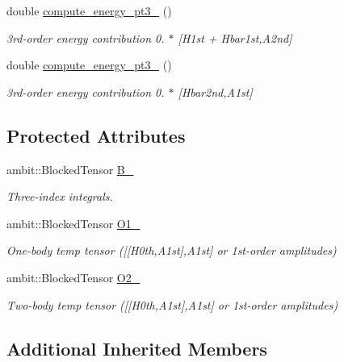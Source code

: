 \begin{DoxyCompactItemize}
double \mbox{\hyperlink{classforte_1_1_s_a___m_r_p_t3_af1f16b278d06c34e845c92f62b8391be}{compute\+\_\+energy\+\_\+pt3\+\_}} ()
\begin{DoxyCompactList}\small\item\em 3rd-\/order energy contribution 0. $\ast$ \mbox{[}H1st + Hbar1st,A2nd\mbox{]} \end{DoxyCompactList}\item 
double \mbox{\hyperlink{classforte_1_1_s_a___m_r_p_t3_a3b84286133023be8bcb7bda90abce666}{compute\+\_\+energy\+\_\+pt3\+\_}} ()
\begin{DoxyCompactList}\small\item\em 3rd-\/order energy contribution 0. $\ast$ \mbox{[}Hbar2nd,A1st\mbox{]} \end{DoxyCompactList}\end{DoxyCompactItemize}
\subsection*{Protected Attributes}
\begin{DoxyCompactItemize}
\item 
ambit\+::\+Blocked\+Tensor \mbox{\hyperlink{classforte_1_1_s_a___m_r_p_t3_ada00fb54bf1e92847e881151d85e9740}{B\+\_\+}}
\begin{DoxyCompactList}\small\item\em Three-\/index integrals. \end{DoxyCompactList}\item 
ambit\+::\+Blocked\+Tensor \mbox{\hyperlink{classforte_1_1_s_a___m_r_p_t3_a5b0747b050768825be3c5ff94adadfc9}{O1\+\_\+}}
\begin{DoxyCompactList}\small\item\em One-\/body temp tensor (\mbox{[}\mbox{[}H0th,A1st\mbox{]},A1st\mbox{]} or 1st-\/order amplitudes) \end{DoxyCompactList}\item 
ambit\+::\+Blocked\+Tensor \mbox{\hyperlink{classforte_1_1_s_a___m_r_p_t3_abd2d0c57869558eee2438f7ea31ac711}{O2\+\_\+}}
\begin{DoxyCompactList}\small\item\em Two-\/body temp tensor (\mbox{[}\mbox{[}H0th,A1st\mbox{]},A1st\mbox{]} or 1st-\/order amplitudes) \end{DoxyCompactList}\end{DoxyCompactItemize}
\subsection*{Additional Inherited Members}



